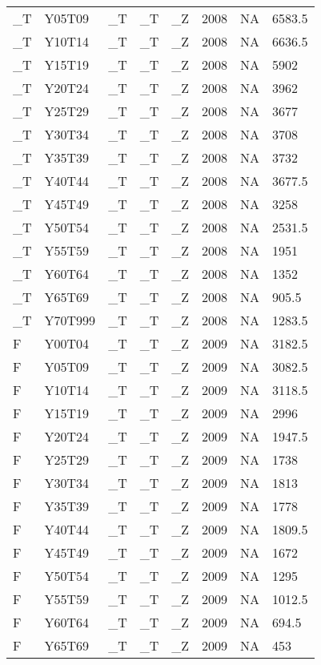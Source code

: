 \begin{longtable}[t]{llllllll}
\_T & Y05T09 & \_T & \_T & \_Z & 2008 & NA & 6583.5\\
\_T & Y10T14 & \_T & \_T & \_Z & 2008 & NA & 6636.5\\
\_T & Y15T19 & \_T & \_T & \_Z & 2008 & NA & 5902\\
\addlinespace
\_T & Y20T24 & \_T & \_T & \_Z & 2008 & NA & 3962\\
\_T & Y25T29 & \_T & \_T & \_Z & 2008 & NA & 3677\\
\_T & Y30T34 & \_T & \_T & \_Z & 2008 & NA & 3708\\
\_T & Y35T39 & \_T & \_T & \_Z & 2008 & NA & 3732\\
\_T & Y40T44 & \_T & \_T & \_Z & 2008 & NA & 3677.5\\
\addlinespace
\_T & Y45T49 & \_T & \_T & \_Z & 2008 & NA & 3258\\
\_T & Y50T54 & \_T & \_T & \_Z & 2008 & NA & 2531.5\\
\_T & Y55T59 & \_T & \_T & \_Z & 2008 & NA & 1951\\
\_T & Y60T64 & \_T & \_T & \_Z & 2008 & NA & 1352\\
\_T & Y65T69 & \_T & \_T & \_Z & 2008 & NA & 905.5\\
\addlinespace
\_T & Y70T999 & \_T & \_T & \_Z & 2008 & NA & 1283.5\\
F & Y00T04 & \_T & \_T & \_Z & 2009 & NA & 3182.5\\
F & Y05T09 & \_T & \_T & \_Z & 2009 & NA & 3082.5\\
F & Y10T14 & \_T & \_T & \_Z & 2009 & NA & 3118.5\\
F & Y15T19 & \_T & \_T & \_Z & 2009 & NA & 2996\\
\addlinespace
F & Y20T24 & \_T & \_T & \_Z & 2009 & NA & 1947.5\\
F & Y25T29 & \_T & \_T & \_Z & 2009 & NA & 1738\\
F & Y30T34 & \_T & \_T & \_Z & 2009 & NA & 1813\\
F & Y35T39 & \_T & \_T & \_Z & 2009 & NA & 1778\\
F & Y40T44 & \_T & \_T & \_Z & 2009 & NA & 1809.5\\
\addlinespace
F & Y45T49 & \_T & \_T & \_Z & 2009 & NA & 1672\\
F & Y50T54 & \_T & \_T & \_Z & 2009 & NA & 1295\\
F & Y55T59 & \_T & \_T & \_Z & 2009 & NA & 1012.5\\
F & Y60T64 & \_T & \_T & \_Z & 2009 & NA & 694.5\\
F & Y65T69 & \_T & \_T & \_Z & 2009 & NA & 453\\

\end{longtable}
